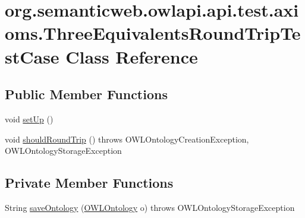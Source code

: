 \hypertarget{classorg_1_1semanticweb_1_1owlapi_1_1api_1_1test_1_1axioms_1_1_three_equivalents_round_trip_test_case}{\section{org.\-semanticweb.\-owlapi.\-api.\-test.\-axioms.\-Three\-Equivalents\-Round\-Trip\-Test\-Case Class Reference}
\label{classorg_1_1semanticweb_1_1owlapi_1_1api_1_1test_1_1axioms_1_1_three_equivalents_round_trip_test_case}
}
\subsection*{Public Member Functions}
\begin{DoxyCompactItemize}
\item 
void \hyperlink{classorg_1_1semanticweb_1_1owlapi_1_1api_1_1test_1_1axioms_1_1_three_equivalents_round_trip_test_case_a80257b1fbb07c2891fce306f3648425b}{set\-Up} ()
\item 
void \hyperlink{classorg_1_1semanticweb_1_1owlapi_1_1api_1_1test_1_1axioms_1_1_three_equivalents_round_trip_test_case_ab66c6d833a8807bccdb9775963db9044}{should\-Round\-Trip} ()  throws O\-W\-L\-Ontology\-Creation\-Exception,             O\-W\-L\-Ontology\-Storage\-Exception 
\end{DoxyCompactItemize}
\subsection*{Private Member Functions}
\begin{DoxyCompactItemize}
\item 
String \hyperlink{classorg_1_1semanticweb_1_1owlapi_1_1api_1_1test_1_1axioms_1_1_three_equivalents_round_trip_test_case_a82de831285cbadaf0301c5efb18aec4f}{save\-Ontology} (\hyperlink{interfaceorg_1_1semanticweb_1_1owlapi_1_1model_1_1_o_w_l_ontology}{O\-W\-L\-Ontology} o)  throws O\-W\-L\-Ontology\-Storage\-Exception 
\end{DoxyCompactItemize}
